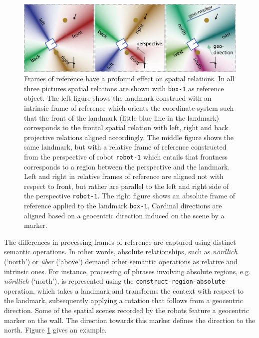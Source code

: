\begin{figure}
\begin{center}
\includegraphics[width=1\columnwidth]{figs/space-scene-3-frames-of-reference.png}
\end{center}
\caption[Spatial relations and frames of reference.]
{Frames of reference have a profound effect on spatial relations. In all three
pictures spatial relations are shown with {\footnotesize\tt box-1} as reference object. The left
figure shows the landmark construed with an intrinsic frame of reference which
orients the coordinate system such that the front of the landmark 
(little blue line in the landmark) corresponds to the frontal spatial relation with
left, right and back projective relations aligned accordingly. The middle figure
shows the same landmark, but with a relative frame of reference constructed
from the perspective of robot {\footnotesize\tt robot-1} which entails that frontness 
corresponds to a region between the perspective and the landmark. 
Left and right in relative frames of reference are aligned not with respect to
front, but rather are parallel to the left and right side of the perspective 
{\footnotesize\tt robot-1}.
The right figure shows an absolute frame of reference applied to the landmark 
{\footnotesize\tt box-1}. Cardinal directions are aligned based on a geocentric direction
induced on the scene by a marker.}
\label{f:frames-of-reference}
\end{figure}


The differences in processing frames of reference are captured using 
distinct semantic operations. In other words, absolute relationships, 
such as \textit{n\"ordlich} (`north') or \textit{\"uber}  (`above') demand other semantic 
operations as relative and intrinsic ones. For instance, 
processing of phrases involving absolute regions, e.g. \textit{n\"ordlich}
(`north'), is represented using the {\footnotesize\tt construct-region-absolute} operation, 
which takes a landmark and transforms the context with respect to the 
landmark, subsequently applying a rotation that follows from a geocentric direction. 
Some of the spatial scenes recorded by the robots feature
a geocentric marker on the wall. The direction towards this marker
defines the direction to the north. Figure \ref{f:frames-of-reference} 
gives an example.

